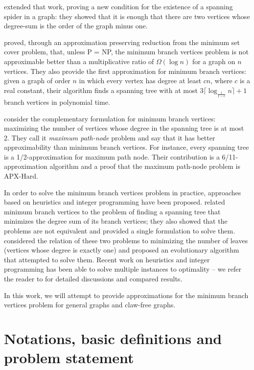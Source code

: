 \documentclass[12pt]{article}
\begin{document}
\cite{flandrin2008} extended that work, proving a new condition for the existence of a spanning spider in a graph: they showed that it is enough that there are two vertices whose degree-sum is the order of the graph minus one.

\cite{salamon2010} proved, through an approximation preserving reduction from the minimum set cover problem, that, unless P = NP, the minimum branch vertices problem is not approximable better than a multiplicative ratio of $\Omega(\log n)$ for a graph on $n$ vertices.
They also provide the first approximation for minimum branch vertices: given a graph of order $n$ in which every vertex has degree at least $cn$, where $c$ is a real constant, their algorithm finds a spanning tree with at most $3\lceil \log_{\frac{1}{1 - c}}n\rceil + 1$ branch vertices in polynomial time.

\cite{chimani2015} consider the complementary formulation for minimum branch vertices: maximizing the number of vertices whose degree in the spanning tree is at most 2.
They call it \emph{maximum path-node} problem and say that it has better approximability than minimum branch vertices. 
For instance, every spanning tree is a 1/2-approximation for maximum path node.
Their contribution is a 6/11-approximation algorithm and a proof that the maximum path-node problem is APX-Hard.

In order to solve the minimum branch vertices problem in practice, approaches based on heuristics and integer programming have been proposed.
\cite{cerulli2009} related minimum branch vertices to the problem of finding a spanning tree that minimizes the degree sum of its branch vertices; they also showed that the problems are not equivalent and provided a single formulation to solve them.
\cite{cerrone2014} considered the relation of these two problems to minimizing the number of leaves (vertices whose degree is exactly one) and proposed an evolutionary algorithm that attempted to solve them.
Recent work on heuristics and integer programming has been able to solve multiple instances to optimality -- we refer the reader to \cite{marin2015, melo2016, silvestri2017} for detailed discussions and compared results.


In this work, we will attempt to provide approximations for the minimum branch vertices problem for general graphs and claw-free graphs.

\section{Notations, basic definitions and problem statement}
\end{document}
